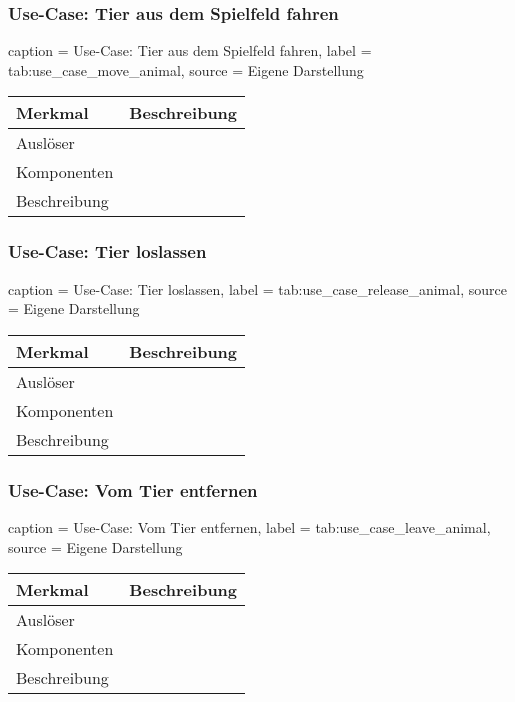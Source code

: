 \subsubsection{Use-Case: Tier aus dem Spielfeld fahren}

\begin{dhbwtable}{%
    caption	= Use-Case: Tier aus dem Spielfeld fahren,
    label	= tab:use_case_move_animal,
    source	= Eigene Darstellung
}
    \begin{tabular}{ll}
        \toprule
        \textbf{Merkmal}     & \textbf{Beschreibung}  \\\midrule
        Auslöser     &\\
        Komponenten  & \\
        Beschreibung & \\\bottomrule
    \end{tabular}    
\end{dhbwtable}

\subsubsection{Use-Case: Tier loslassen}

\begin{dhbwtable}{%
    caption	= Use-Case: Tier loslassen,
    label	= tab:use_case_release_animal,
    source	= Eigene Darstellung
}
    \begin{tabular}{ll}
        \toprule
        \textbf{Merkmal}     & \textbf{Beschreibung}  \\\midrule
        Auslöser     &\\
        Komponenten  & \\
        Beschreibung & \\\bottomrule
    \end{tabular}    
\end{dhbwtable}

\subsubsection{Use-Case: Vom Tier entfernen}

\begin{dhbwtable}{%
    caption	= Use-Case: Vom Tier entfernen,
    label	= tab:use_case_leave_animal,
    source	= Eigene Darstellung
}
    \begin{tabular}{ll}
        \toprule
        \textbf{Merkmal}     & \textbf{Beschreibung}  \\\midrule
        Auslöser     &\\
        Komponenten  & \\
        Beschreibung & \\\bottomrule
    \end{tabular}    
\end{dhbwtable}